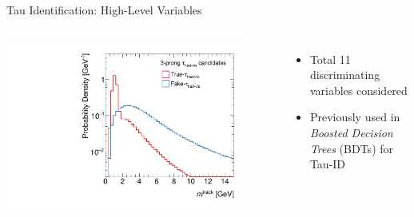 \documentclass[11pt, xcolor={dvipsnames}, aspectratio=169]{beamer}
\begin{document}
\begin{frame}{Tau Identification: High-Level Variables}
\begin{columns}[onlytextwidth]
\begin{columns}[onlytextwidth]
      \centering


      \includegraphics[width=0.9\textwidth]{tauid/invars/invars_masstrksys_3P}
    \end{columns}

    \vspace*{0.5em}

    \begin{itemize}
    \item Total 11 discriminating variables considered
    \item Previously used in \emph{Boosted Decision Trees} (BDTs) for Tau-ID
    \end{itemize}
  \end{columns}
\end{frame}




\end{document}
